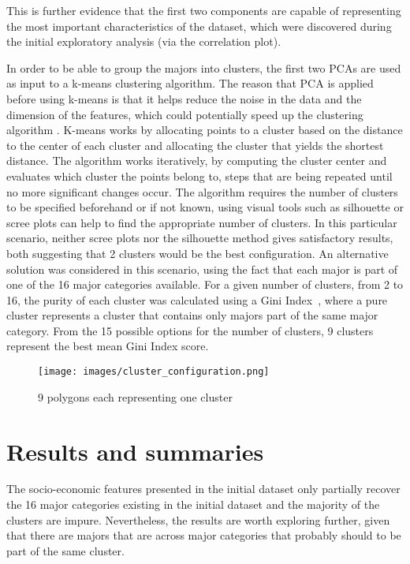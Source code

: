 \documentclass[11pt]{article}
\begin{document}
This is further evidence that the first two components are capable of representing the most important characteristics of the dataset, which were discovered during the initial exploratory analysis (via the correlation plot).

In order to be able to group the majors into clusters, the first two PCAs are used as input to a k-means clustering algorithm. The reason that PCA is applied before using k-means is that it helps reduce the noise in the data and the dimension of the features, which could potentially speed up the clustering algorithm \cite{kmeanspca}.  K-means works by allocating points to a cluster based on the distance to the center of each cluster and allocating the cluster that yields the shortest distance. The algorithm works iteratively, by computing the cluster center and evaluates which cluster the points belong to, steps that are being repeated until no more significant changes occur. The algorithm requires the number of clusters to be specified beforehand or if not known, using visual tools such as silhouette or scree plots can help to find the appropriate number of clusters. In this particular scenario, neither scree plots nor the silhouette method gives satisfactory results, both suggesting that 2 clusters would be the best configuration. An alternative solution was considered in this scenario, using the fact that each major is part of one of the 16 major categories available. For a given number of clusters, from 2 to 16, the purity of each cluster was calculated using a Gini Index~\cite{giniindex}, where a pure cluster represents a cluster that contains only majors part of the same major category. From the 15 possible options for the number of clusters, 9 clusters represent the best mean Gini Index score.

\begin{figure} [H]
    \begin{center}
        \texttt{[image: images/cluster\_configuration.png]}
        \caption{9 polygons each representing one cluster}
        \label{fig:clusters}
    \end{center}
\end{figure}

\section*{Results and summaries} 

The socio-economic features presented in the initial dataset only partially recover the 16 major categories existing in the initial dataset and the majority of the clusters are impure. Nevertheless, the results are worth exploring further, given that there are majors that are across major categories that probably should to be part of the same cluster.
\end{document}
